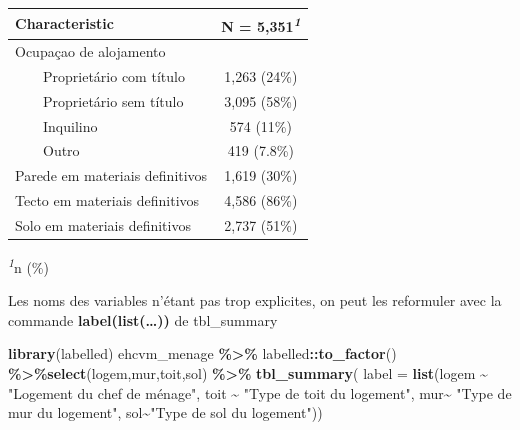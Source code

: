 \documentclass[
]{article}
\newenvironment{Shaded}{\begin{snugshade}}{\end{snugshade}}
\newcommand{\AttributeTok}[1]{\textcolor[rgb]{0.13,0.29,0.53}{#1}}
\newcommand{\FunctionTok}[1]{\textcolor[rgb]{0.13,0.29,0.53}{\textbf{#1}}}
\newcommand{\NormalTok}[1]{#1}
\newcommand{\SpecialCharTok}[1]{\textcolor[rgb]{0.81,0.36,0.00}{\textbf{#1}}}
\newcommand{\StringTok}[1]{\textcolor[rgb]{0.31,0.60,0.02}{#1}}
\begin{document}
\begin{table}[!t]
\fontsize{12.0pt}{14.4pt}\selectfont
\begin{tabular*}{\linewidth}{@{\extracolsep{\fill}}lc}
\toprule
\textbf{Characteristic} & \textbf{N = 5,351}\textsuperscript{\textit{1}} \\ 
\midrule\addlinespace[2.5pt]
Ocupaçao de alojamento &  \\ 
    Proprietário com título & 1,263 (24\%) \\ 
    Proprietário sem título & 3,095 (58\%) \\ 
    Inquilino & 574 (11\%) \\ 
    Outro & 419 (7.8\%) \\ 
Parede em materiais definitivos & 1,619 (30\%) \\ 
Tecto em materiais definitivos & 4,586 (86\%) \\ 
Solo em materiais definitivos & 2,737 (51\%) \\ 
\bottomrule
\end{tabular*}
\begin{minipage}{\linewidth}
\textsuperscript{\textit{1}}n (\%)\\
\end{minipage}
\end{table}

Les noms des variables n'étant pas trop explicites, on peut les
reformuler avec la commande \textbf{label(list(\ldots))} de tbl\_summary

\begin{Shaded}
\begin{Highlighting}[]
\FunctionTok{library}\NormalTok{(labelled)}
\NormalTok{ehcvm\_menage }\SpecialCharTok{\%\textgreater{}\%}\NormalTok{ labelled}\SpecialCharTok{::}\FunctionTok{to\_factor}\NormalTok{() }\SpecialCharTok{\%\textgreater{}\%}\FunctionTok{select}\NormalTok{(logem,mur,toit,sol) }\SpecialCharTok{\%\textgreater{}\%} \FunctionTok{tbl\_summary}\NormalTok{( }\AttributeTok{label =} \FunctionTok{list}\NormalTok{(logem }\SpecialCharTok{\textasciitilde{}} \StringTok{"Logement du chef de ménage"}\NormalTok{,}
\NormalTok{ toit }\SpecialCharTok{\textasciitilde{}} \StringTok{"Type de toit du logement"}\NormalTok{,}
\NormalTok{ mur}\SpecialCharTok{\textasciitilde{}} \StringTok{"Type de mur du logement"}\NormalTok{,}
\NormalTok{ sol}\SpecialCharTok{\textasciitilde{}}\StringTok{"Type de sol du logement"}\NormalTok{)) }
\end{Highlighting}
\end{Shaded}
\end{document}
